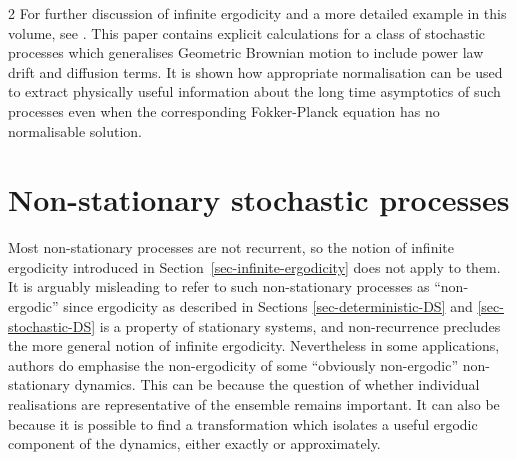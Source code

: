\documentclass[11pt]{article}
\begin{document}
\begin{multicols}{2}
For further discussion of infinite ergodicity and a more detailed example in this volume, see \cite{GiordanoBlossey_GeneralizedGeometricBrownian}. This paper contains explicit calculations for a class of stochastic processes which generalises Geometric Brownian motion to include power law drift and diffusion terms. 
It is shown how appropriate normalisation can be used to extract physically useful information about the long time asymptotics of such processes even when the corresponding Fokker-Planck equation has no normalisable solution.

\section{Non-stationary stochastic processes}
\label{sec-non-stationary-processes}
Most non-stationary processes are not recurrent, so the notion of infinite ergodicity introduced in Section~\ref{sec-infinite-ergodicity} does not apply to them.
It is arguably misleading to refer to such non-stationary processes as ``non-ergodic'' since ergodicity as described in Sections \ref{sec-deterministic-DS} and \ref{sec-stochastic-DS} is a property of stationary systems, and non-recurrence precludes the more general notion of infinite ergodicity.
Nevertheless in some applications, authors do emphasise the non-ergodicity of some ``obviously non-ergodic''  non-stationary dynamics.
This can be because the question of whether individual realisations are representative of the ensemble remains important.
It can also be because it is possible to find a transformation which isolates a useful ergodic component of the dynamics, either exactly or approximately.


\end{multicols}
\end{document}
